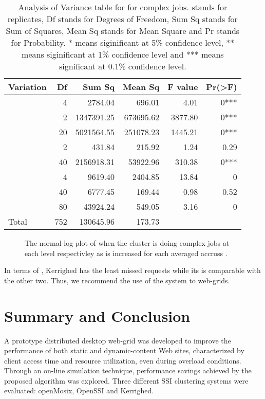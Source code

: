 \documentclass[preprint]{acm_proc_article-sp}
\begin{document}
\begin{table*}
	\caption{Analysis of Variance table for  for complex jobs.  stands for replicates, Df stands for Degrees of Freedom, Sum Sq stands for Sum of Squares, Mean Sq stands for Mean Square and Pr stands for Probability. * means siginificant at 5\% confidence level, ** means siginificant at 1\% confidence level and *** means significant at 0.1\% confidence level.}
	\label{table4}
	\centering
	\begin{tabular}{l|rrrrr}
		\hline\hline
		Variation&Df&Sum Sq&Mean Sq&F value&Pr(>F)\\
		\hline
		&4&2784.04&696.01&4.01&0***\\
		&2&1347391.25&673695.62&3877.80&0***\\
		&20&5021564.55&251078.23&1445.21&0***\\
		&2&431.84&215.92&1.24&0.29\\
		&40&2156918.31&53922.96&310.38&0***\\
		&4&9619.40&2404.85&13.84&0\\
		&40&6777.45&169.44&0.98&0.52\\
		&80&43924.24&549.05&3.16&0\\
		\hline
		Total&752&130645.96&173.73\\
		\hline\hline
	\end{tabular}
\end{table*}

\begin{figure*}[htb]
        \centering
{}
        \caption{The normal-log plot of  when the cluster is doing complex jobs at each  level respectivley as  is increased for each  averaged accross .}
        \label{res4}
\end{figure*}

In terms of , Kerrighed has the least missed requests while its  is comparable with the other two. Thus, we recommend the use of the system to web-grids.

\section{Summary and Conclusion}
A prototype distributed desktop web-grid was developed to improve the performance of both static and dynamic-content Web sites, characterized by client access time and resource utilization, even during overload conditions. Through an on-line simulation technique, performance savings achieved by the proposed algorithm was explored. Three different SSI clustering systems were evaluated: openMosix, OpenSSI and Kerrighed.
\end{document}
